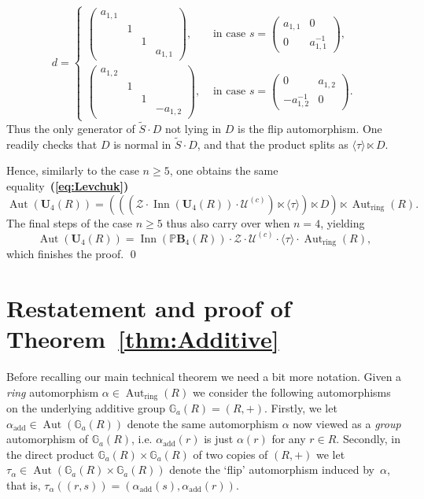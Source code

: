 \documentclass[a4paper,11pt]{amsart}
\numberwithin{equation}{section}
\theoremstyle{plain}
\theoremstyle{definition}
\newcommand{\anel}[1]{#1_{\text{ring}}} %
\newcommand{\addi}[1]{#1_{\text{add}}} %
\newcommand{\mbU}{\mathbf{U}} %
\newcommand{\Addi}{\mathbb{G}_{a}} %
\newcommand{\PB}{\mathbb{P}\mathbf{B}} %
\newcommand{\gera}[1]{\langle {#1} \rangle}
\newcommand{\mc}{\mathcal}
\newcommand{\bref}[1]{{\bf(\ref{#1})}} %
\DeclareMathOperator{\Aut}{Aut}
\DeclareMathOperator{\Inn}{Inn}
\begin{document}
\[ d = 
\begin{cases} \left( \begin{smallmatrix} a_{1,1} & & & \\ & 1 & & \\ & & 1 & \\ & & & a_{1,1} \end{smallmatrix} \right), & \text{ in case } s = \left( \begin{smallmatrix} a_{1,1} & 0 \\ 0 & a_{1,1}^{-1} \end{smallmatrix} \right), \\
\left( \begin{smallmatrix} a_{1,2} & & & \\ & 1 & & \\ & & 1 & \\ & & & -a_{1,2} \end{smallmatrix} \right), & \text{ in case } s = \left( \begin{smallmatrix} 0 & a_{1,2} \\ -a_{1,2}^{-1} & 0 \end{smallmatrix} \right).
\end{cases}
\]
Thus the only generator of $\widetilde{S} \cdot D$ not lying in $D$ is the flip automorphism. One readily checks that $D$ is normal in $\widetilde{S} \cdot D$, and that the product splits as $\gera{\tau} \ltimes D$. 

Hence, similarly to the case $n \geq 5$, one obtains the same equality~\bref{eq:Levchuk}
\[ \Aut(\mbU_4(R)) = (((\mc{Z} \cdot \Inn(\mbU_4(R)) \cdot \mc{U}^{(c)}) \ltimes \gera{\tau}) \ltimes D) \ltimes \anel{\Aut}(R). \]
The final steps of the case $n\geq 5$ thus also carry over when $n = 4$, yielding 
\[\Aut(\mbU_4(R)) = \Inn(\PB_4(R)) \cdot \mc{Z} \cdot \mc{U}^{(c)} \cdot \gera{\tau} \cdot \anel{\Aut}(R),\]
which finishes the proof. \qed

\section{Restatement and proof of Theorem~\ref{thm:Additive}}\label{sec:provadothmB} 
Before recalling our main technical theorem we need a bit more notation. Given a \emph{ring} automorphism $\alpha \in \anel{\Aut}(R)$ we consider the following automorphisms on the underlying additive group $\Addi(R) = (R,+)$. 
Firstly, we let $\addi{\alpha} \in \Aut(\Addi(R))$ denote the same automorphism $\alpha$ now viewed as a \emph{group} automorphism of $\Addi(R)$, i.e. $\addi{\alpha}(r)$ is just $\alpha(r)$ for any $r \in R$. Secondly, in the direct product $\Addi(R) \times \Addi(R)$ of two copies of $(R,+)$ we let $\tau_\alpha \in \Aut(\Addi(R) \times \Addi(R))$ denote the `flip' automorphism induced by~$\alpha$, that is, $\tau_\alpha((r,s)) = (\addi{\alpha}(s),\addi{\alpha}(r))$.
\end{document}
